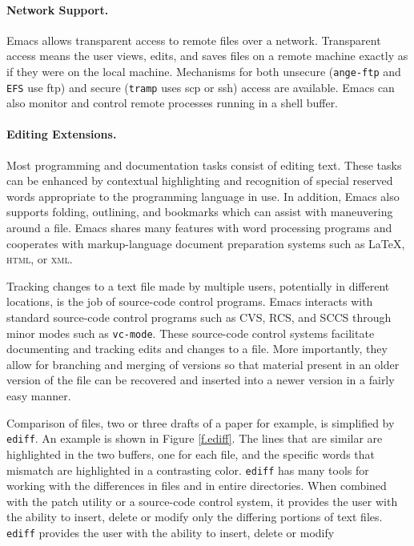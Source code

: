 \documentclass{article}
\newcommand{\stexttt}[1]{{\small\texttt{#1}}}
\begin{document}
\paragraph{Network Support.}
Emacs allows transparent access to remote files over a network.
Transparent access means the user views, edits, and saves files on a
remote machine exactly as if they were on the local machine.
Mechanisms for both unsecure (\stexttt{ange-ftp} and \stexttt{EFS} use
ftp) and secure (\stexttt{tramp} uses scp or ssh) access are
available. %
Emacs can also monitor and control remote processes running in a shell buffer.

\paragraph{Editing Extensions.}
Most programming and documentation tasks consist of editing text.
These tasks can be enhanced by contextual highlighting and recognition
of special reserved words appropriate to the programming language in
use.  In addition, Emacs also supports folding, outlining, and
bookmarks which can assist with maneuvering around a file.  Emacs
shares many features with word processing programs and cooperates with
markup-language document preparation systems such as \LaTeX,
\textsc{html}, or \textsc{xml}.

Tracking changes to a text file made by multiple users, potentially in 
different locations, is the job of source-code control programs.
Emacs interacts with standard source-code control programs such as CVS, RCS,
and SCCS through minor modes such as \stexttt{vc-mode}.  These
source-code control systems facilitate documenting and tracking edits and
changes to a file.  More importantly, they allow for branching and
merging of versions so that material present in an older version of
the file can be recovered and inserted into a newer version in a
fairly easy manner.

Comparison of files, two or three drafts of a paper for example, is
simplified by \stexttt{ediff}.  An example is shown in Figure
\ref{f.ediff}.  The lines that are similar are highlighted in the two
buffers, one for each file, and the specific words that mismatch are
highlighted in a contrasting color.  \stexttt{ediff} has many tools
for working with the differences in files and in entire directories.
When combined with the patch utility or a source-code control system, 
it provides the user with the ability to insert, delete or modify
only the differing portions of text files.
\stexttt{ediff} provides the user with the ability to insert, delete or modify
\end{document}
